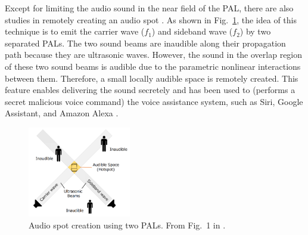 {
    Except for limiting the audio sound in the near field of the PAL, there are also studies in remotely creating an audio spot \cite{Ye2008GenerationAudibleSound, Ji2009InvestigationLocalizedSound, Matsui2013DesignAudioSpot, Iijima2019AudioHotspotAttack}.
    As shown in Fig.~\ref{fig:92sdjfjj}, the idea of this technique is to emit the carrier wave ($f_1$) and sideband wave ($f_2$) by two separated PALs. 
    The two sound beams are inaudible along their propagation path because they are ultrasonic waves.
    However, the sound in the overlap region of these two sound beams is audible due to the parametric nonlinear interactions between them.
    Therefore, a small locally audible space is remotely created.
    This feature enables delivering the sound secretely and has been used to  (performs a secret malicious voice command) the voice assistance system, such as Siri, Google Assistant, and Amazon Alexa \cite{Iijima2019AudioHotspotAttack}.
}

\begin{figure}[!htb]
    \centering
    \includegraphics[width = 0.4\textwidth]{fig/Ijima2019.png}
    \caption{Audio spot creation using two PALs. From Fig.~1 in \cite{Iijima2019AudioHotspotAttack}.}
    \label{fig:92sdjfjj}
\end{figure}



